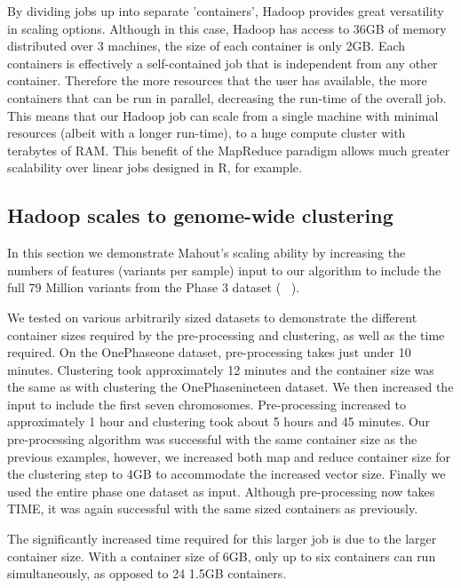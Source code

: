 \documentclass{bioinfo}
\begin{document}
By dividing jobs up into separate 'containers', Hadoop provides great versatility in scaling options. Although in this case, Hadoop has access to 36GB of memory distributed over 3 machines, the size of each container is only 2GB.
Each containers is effectively a self-contained job that is independent from any other container.
Therefore the more resources that the user has available, the more containers that can be run in parallel, decreasing the run-time of the overall job.
This means that our Hadoop job can scale from a single machine with minimal resources (albeit with a longer run-time), to a huge compute cluster with terabytes of RAM.
This benefit of the MapReduce paradigm allows much greater scalability over linear jobs designed in R, for example.

\subsection*{Hadoop scales to genome-wide clustering}
In this section we demonstrate Mahout's scaling ability by increasing the numbers of features (variants per sample) input to our algorithm to include the full 79 Million variants from the Phase 3 dataset ( \FullPhasethree\ ). 

We tested on various arbitrarily sized datasets to demonstrate the different container sizes required by the pre-processing and clustering, as well as the time required.
On the OnePhaseone dataset, pre-processing takes just under 10 minutes. Clustering took approximately 12 minutes and the container size was the same as with clustering the OnePhasenineteen dataset.
We then increased the input to include the first seven chromosomes. Pre-processing increased to approximately 1 hour and clustering took about 5 hours and 45 minutes.
Our pre-processing algorithm was successful with the same container size as the previous examples, however, we increased both map and reduce container size for the clustering step to 4GB to accommodate the increased vector size.
Finally we used the entire phase one dataset as input. Although pre-processing now takes TIME, it was again successful with the same sized containers as previously.

The significantly increased time required for this larger job is due to the larger container size. With a container size of 6GB, only up to six containers can run simultaneously, as opposed to 24 1.5GB containers.
\end{document}

